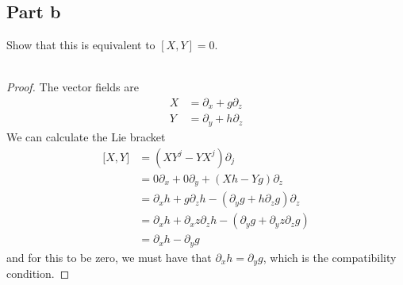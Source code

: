 \documentclass[fontsize=11pt]{scrartcl} %
\numberwithin{equation}{section} %
\numberwithin{figure}{section} %
\numberwithin{table}{section} %
\begin{document}
\subsection*{Part b}
Show that this is equivalent to $[X,Y] = 0$.
\\
\\
\begin{proof}
    The vector fields are
    \[
        \begin{aligned}
            X &= \partial_x + g\partial_z\\
            Y &= \partial_y + h\partial_z
        \end{aligned}
    \]
    We can calculate the Lie bracket
    \[
        \begin{aligned}
            {[}X,Y{]} &= (XY^j-YX^j)\partial_j\\
                    &= 0\partial_x + 0\partial_y + (Xh-Yg)\partial_z\\
                    &= \partial_xh + g\partial_zh - (\partial_yg +
                    h\partial_zg)\partial_z\\
                    &=\partial_xh+\partial_xz\partial_zh -
                    (\partial_yg+\partial_yz\partial_zg)\\
                    &=\partial_xh - \partial_yg
        \end{aligned}
    \]
    and for this to be zero, we must have that $\partial_xh=\partial_yg$, which
    is the compatibility condition.
\end{proof}
\end{document}
